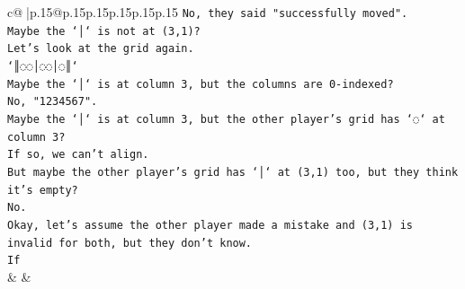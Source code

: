 \documentclass{article}
\begin{document}
{\begin{supertabular}{c@{$\;$}|p{.15\linewidth}@{}p{.15\linewidth}p{.15\linewidth}p{.15\linewidth}p{.15\linewidth}p{.15\linewidth}}
{{{\texttt{No, they said "successfully moved".} \\
\texttt{Maybe the `│` is not at (3,1)?} \\
\texttt{Let's look at the grid again.} \\
\texttt{`║◌◌│◌◌│◌║`} \\
\texttt{Maybe the `│` is at column 3, but the columns are 0{-}indexed?} \\
\texttt{No, "1234567".} \\
\texttt{Maybe the `│` is at column 3, but the other player's grid has `◌` at column 3?} \\
\texttt{If so, we can't align.} \\
\texttt{But maybe the other player's grid has `│` at (3,1) too, but they think it's empty?} \\
\texttt{No.} \\
\texttt{Okay, let's assume the other player made a mistake and (3,1) is invalid for both, but they don't know.} \\
\texttt{If} \\
            }
        }
    }
    & & \\ \\


\end{supertabular}}
\end{document}
